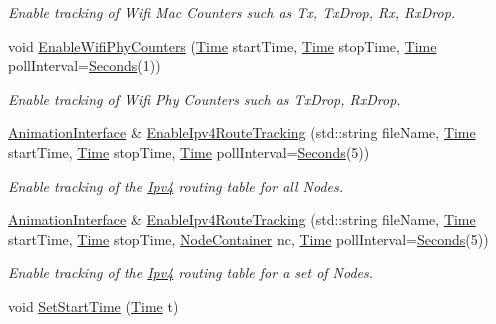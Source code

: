 \begin{DoxyCompactItemize}
\begin{DoxyCompactList}\small\item\em Enable tracking of Wifi Mac Counters such as Tx, Tx\+Drop, Rx, Rx\+Drop. \end{DoxyCompactList}\item 
void \hyperlink{classns3_1_1AnimationInterface_a9e0e3d4c754d00f9f2030a35a664ee26}{Enable\+Wifi\+Phy\+Counters} (\hyperlink{classns3_1_1Time}{Time} start\+Time, \hyperlink{classns3_1_1Time}{Time} stop\+Time, \hyperlink{classns3_1_1Time}{Time} poll\+Interval=\hyperlink{group__timecivil_ga33c34b816f8ff6628e33d5c8e9713b9e}{Seconds}(1))
\begin{DoxyCompactList}\small\item\em Enable tracking of Wifi Phy Counters such as Tx\+Drop, Rx\+Drop. \end{DoxyCompactList}\item 
\hyperlink{classns3_1_1AnimationInterface}{Animation\+Interface} \& \hyperlink{classns3_1_1AnimationInterface_a98e4bbb60184f59a5643b61aaa7a25a3}{Enable\+Ipv4\+Route\+Tracking} (std\+::string file\+Name, \hyperlink{classns3_1_1Time}{Time} start\+Time, \hyperlink{classns3_1_1Time}{Time} stop\+Time, \hyperlink{classns3_1_1Time}{Time} poll\+Interval=\hyperlink{group__timecivil_ga33c34b816f8ff6628e33d5c8e9713b9e}{Seconds}(5))
\begin{DoxyCompactList}\small\item\em Enable tracking of the \hyperlink{classns3_1_1Ipv4}{Ipv4} routing table for all Nodes. \end{DoxyCompactList}\item 
\hyperlink{classns3_1_1AnimationInterface}{Animation\+Interface} \& \hyperlink{classns3_1_1AnimationInterface_a619ed6b1b95f1f9d70805376229253d1}{Enable\+Ipv4\+Route\+Tracking} (std\+::string file\+Name, \hyperlink{classns3_1_1Time}{Time} start\+Time, \hyperlink{classns3_1_1Time}{Time} stop\+Time, \hyperlink{classns3_1_1NodeContainer}{Node\+Container} nc, \hyperlink{classns3_1_1Time}{Time} poll\+Interval=\hyperlink{group__timecivil_ga33c34b816f8ff6628e33d5c8e9713b9e}{Seconds}(5))
\begin{DoxyCompactList}\small\item\em Enable tracking of the \hyperlink{classns3_1_1Ipv4}{Ipv4} routing table for a set of Nodes. \end{DoxyCompactList}\item 
void \hyperlink{classns3_1_1AnimationInterface_a86d09ac63a8f9b9e18edb703979fc9d7}{Set\+Start\+Time} (\hyperlink{classns3_1_1Time}{Time} t)

\end{DoxyCompactItemize}
